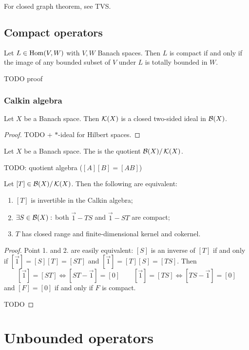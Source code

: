 For closed graph theorem, see TVS.


\subsection{Compact operators}
\begin{proposition}
Let $L\in\operatorname{Hom}(V,W)$ with $V,W$ Banach spaces. Then $L$ is compact \textup{if and only if} the image of any bounded subset of $V$ under $L$ is totally bounded in $W$.
\end{proposition}
TODO proof


\subsubsection{Calkin algebra}
\begin{proposition}
Let $X$ be a Banach space. Then $\operatorname{\mathcal{K}}(X)$ is a closed two-sided ideal in $\operatorname{\mathcal{B}}(X)$.
\end{proposition}
\begin{proof}
TODO + $*$-ideal for Hilbert spaces.
\end{proof}

\begin{definition}
Let $X$ be a Banach space. The  is the quotient $\operatorname{\mathcal{B}}(X)/\operatorname{\mathcal{K}}(X)$.
\end{definition}
TODO: quotient algebra ($[A][B] = [AB]$)

\begin{proposition}
Let $[T]\in\operatorname{\mathcal{B}}(X)/\operatorname{\mathcal{K}}(X)$. Then the following are equivalent:
\begin{enumerate}
\item $[T]$ is invertible in the Calkin algebra;
\item $\exists S\in\operatorname{\mathcal{B}}(X):$ both $\vec{1}-TS$ and $\vec{1}-ST$ are compact;
\item $T$ has closed range and finite-dimensional kernel and cokernel. 
\end{enumerate}
\end{proposition}
\begin{proof}
Point 1. and 2. are easily equivalent: $[S]$ is an inverse of $[T]$ if and only if $[\vec{1}] = [S][T] = [ST]$ and $[\vec{1}] = [T][S] = [TS]$. Then
\[ [\vec{1}] = [ST] \iff [ST - \vec{1}] = [0] \qquad [\vec{1}] = [TS] \iff [TS - \vec{1}] = [0] \]
and $[F]=[0]$ if and only if $F$ is compact.

TODO
\end{proof}

\section{Unbounded operators}




